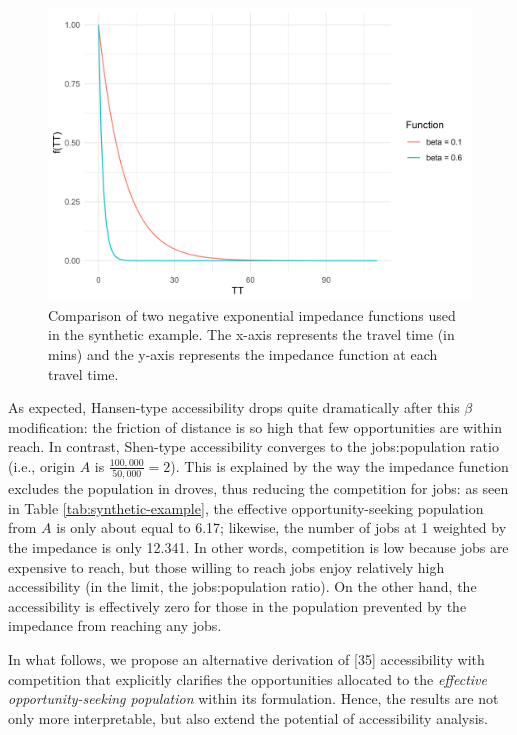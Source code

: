 \documentclass[10pt,letterpaper]{article}
\begin{document}
\begin{figure}
\includegraphics[width=1\linewidth]{images/Fig2} \caption{\label{fig:Fig2}Comparison of two negative exponential impedance functions used in the synthetic example. The x-axis represents the travel time (in mins) and the y-axis represents the impedance function at each travel time.}\label{fig:comparison-impedance-functions-synthetic-example}
\end{figure}

As expected, Hansen-type accessibility drops quite dramatically after
this \(\beta\) modification: the friction of distance is so high that
few opportunities are within reach. In contrast, Shen-type accessibility
converges to the jobs:population ratio (i.e., origin \(A\) is
\(\frac{100,000}{50,000} = 2\)). This is explained by the way the
impedance function excludes the population in droves, thus reducing the
competition for jobs: as seen in Table \ref{tab:synthetic-example}, the
effective opportunity-seeking population from \(A\) is only about equal
to 6.17; likewise, the number of jobs at 1 weighted by the impedance is
only 12.341. In other words, competition is low because jobs are
expensive to reach, but those willing to reach jobs enjoy relatively
high accessibility (in the limit, the jobs:population ratio). On the
other hand, the accessibility is effectively zero for those in the
population prevented by the impedance from reaching any jobs.

In what follows, we propose an alternative derivation of {[}35{]}
accessibility with competition that explicitly clarifies the
opportunities allocated to the \emph{effective opportunity-seeking
population} within its formulation. Hence, the results are not only more
interpretable, but also extend the potential of accessibility analysis.
\end{document}
